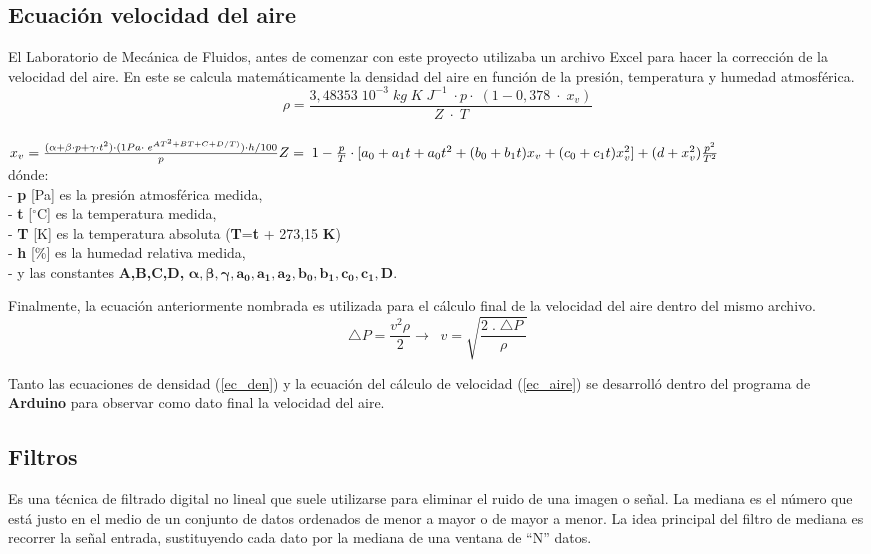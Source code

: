 \subsection{Ecuación velocidad del aire}
El Laboratorio de Mecánica de Fluidos, antes de comenzar con este proyecto utilizaba un archivo Excel para hacer la corrección de la velocidad del aire. En este se calcula matemáticamente la densidad del aire en función de la presión, temperatura y humedad atmosférica.
\begin{equation}
	\rho=\frac{3,48353\;10^{-3}\;kg\;K\;J^{-1}\;\cdot p\cdot\;(1-0,378\;\cdot\;x_v)}{Z\;\cdot\;T} \label{ec_den}
\end{equation}
\\
\begin{math}
	x_v=\frac{(\alpha+\beta\cdot p+\gamma\cdot t^2)\cdot(1Pa\cdot\;e^{AT^2+BT+C+D/T)})\cdot h/100}p\\\\
	Z=\;1-\frac pT\cdot\lbrack a_0+a_1t+a_0t^2+(b_0+b_1t)x_v+(c_0+c_1t)x_v^2\rbrack+(d+x_v^2)\frac{p^2}{T^2}
\end{math}
\\
dónde:\\
- \textbf{p } [Pa] es la presión atmosférica medida,\\
- \textbf{t } [$^{\circ}$C] es la temperatura medida,\\
- \textbf{T } [K] es la temperatura absoluta (\textbf{T}=\textbf{t} + 273,15 \textbf{K})\\
- \textbf{h } [\%] es la humedad relativa medida,\\
- y las constantes \textbf{A,B,C,D,} $\boldsymbol{\alpha , \beta  , \gamma , a_0, a_1 ,a_2 ,b_0  ,b_1 , c_0 , c_1, D. }$


Finalmente, la ecuación anteriormente nombrada es utilizada para el cálculo final de la velocidad del aire dentro del mismo archivo.
\begin{equation}
	\triangle P=\frac{v^2\rho}2\rightarrow\;\;v=\sqrt{\frac{2\;.\;\triangle P\;}\rho}
	\label{ec_aire}
\end{equation}

Tanto las ecuaciones de densidad (\ref{ec_den})
 y la ecuación del cálculo de velocidad  (\ref{ec_aire})
  se desarrolló dentro del programa de \textbf{Arduino} para observar como dato final la velocidad del aire.


\subsection{Filtros}
\begin{tcolorbox}[colback=blue!5!white,colframe=blue!75!black,title=Mediana]
	Es una técnica de filtrado digital no lineal que suele utilizarse para eliminar el ruido de una imagen o señal. La mediana es el número que está justo en el medio de un conjunto de datos ordenados de menor a mayor o de mayor a menor.
	La idea principal del filtro de mediana es recorrer la señal entrada, sustituyendo cada dato por la mediana de una ventana de “N” datos.
\end{tcolorbox}

